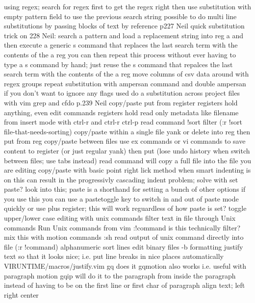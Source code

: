 \documentclass[12pt]{book}
\begin{document}
    using regex; search for regex first to get the regex right then use substitution with empty pattern field to use the previous search string
    possible to do multi line substitutions by passing blocks of text by reference p227 Neil
    quick substitution trick on 228 Neil: search a pattern and load a replacement string into reg a and then execute a generic s command that replaces the last search term with the contents of the a reg
      you can then repeat this process without ever having to type a s command by hand; just reuse the s command that repalces the last search term with the contents of the a reg
    move columns of csv data around with regex groups
    repeat substitution with ampersan command and double ampersan if you don't want to ignore any flags used
    do a substitution across project files with vim grep and cfdo p.239 Neil
  copy/paste
    put from register
      registers hold anything, even edit commands
      registers hold read only metadata like filename
      from insert mode with ctrl-r and ctrl-r ctrl-p
    read command
      !sort filter (:r !sort file-that-needs-sorting)
    copy/paste within a single file
      yank or delete into reg then put from reg
    copy/paste between files
      use ex commands or vi commands to save content to register (or just regular yank) then put (lose undo history when switch between files; use tabs instead)
      read command will copy a full file into the file you are editing
    copy/paste with basic point right lick method
      when smart indenting is on this can result in the progressivly cascading indent problem;
        solve with set paste?  look into this; paste is a shorthand for setting a bunch of other options
        if you use this you can use a pastetoggle key to switch in and out of paste mode quickly
        or use plus register; this will work reguardless of how paste is set?
  toggle upper/lower case
  editing with unix commands
    filter text in file through Unix commands
    Run Unix commands from vim
      :!command
        is this technically filter?
        mix this with motion commands
      :sh
      read output of unix command directly into file (:r !command)
  alphanumeric sort lines
  edit binary files -b
  formatting
    justify text so that it looks nice; i.e. put line breaks in nice places automatically
      VIRUNTIME/macros/justify.vim
      gq does it
      gqmotion also works i.e. useful with paragraph motion
      gqip will do it to the paragraph from inside the paragraph instead of having to be on the first line or first char of paragraph
    align text; left right center
\end{document}
